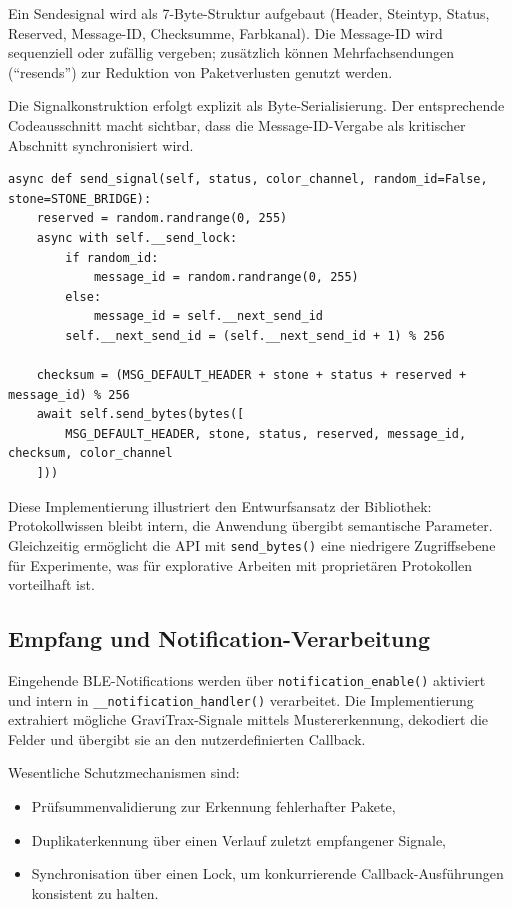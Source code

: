 Ein Sendesignal wird als 7-Byte-Struktur aufgebaut (Header, Steintyp, Status, Reserved, Message-ID, Checksumme, Farbkanal).
Die Message-ID wird sequenziell oder zufällig vergeben; zusätzlich können Mehrfachsendungen (\enquote{resends}) zur Reduktion von Paketverlusten genutzt werden.

Die Signalkonstruktion erfolgt explizit als Byte-Serialisierung.
Der entsprechende Codeausschnitt macht sichtbar, dass die Message-ID-Vergabe als kritischer Abschnitt synchronisiert wird.

\begin{listing}[ht]
\caption{Auszug: Konstruktion und Versand eines GraviTrax-Signals}
\label{lst:send-signal}
\begin{verbatim}
async def send_signal(self, status, color_channel, random_id=False, stone=STONE_BRIDGE):
	reserved = random.randrange(0, 255)
	async with self.__send_lock:
		if random_id:
			message_id = random.randrange(0, 255)
		else:
			message_id = self.__next_send_id
		self.__next_send_id = (self.__next_send_id + 1) % 256

	checksum = (MSG_DEFAULT_HEADER + stone + status + reserved + message_id) % 256
	await self.send_bytes(bytes([
		MSG_DEFAULT_HEADER, stone, status, reserved, message_id, checksum, color_channel
	]))
\end{verbatim}
\end{listing}

Diese Implementierung illustriert den Entwurfsansatz der Bibliothek:
Protokollwissen bleibt intern, die Anwendung übergibt semantische Parameter.
Gleichzeitig ermöglicht die API mit \texttt{send\_bytes()} eine niedrigere Zugriffsebene für Experimente, was für explorative Arbeiten mit proprietären Protokollen vorteilhaft ist.

\subsection{Empfang und Notification-Verarbeitung}
Eingehende BLE-Notifications werden über \texttt{notification\_enable()} aktiviert und intern in \texttt{\_\_notification\_handler()} verarbeitet.
Die Implementierung extrahiert mögliche GraviTrax-Signale mittels Mustererkennung, dekodiert die Felder und übergibt sie an den nutzerdefinierten Callback.

Wesentliche Schutzmechanismen sind:
\begin{itemize}
	\item Prüfsummenvalidierung zur Erkennung fehlerhafter Pakete,
	\item Duplikaterkennung über einen Verlauf zuletzt empfangener Signale,
	\item Synchronisation über einen Lock, um konkurrierende Callback-Ausführungen konsistent zu halten.
\end{itemize}

